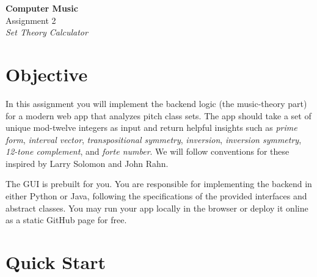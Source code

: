 \documentclass[11pt,letterpaper]{article}
\begin{document}
\begin{center}
{\Huge\sffamily\bfseries Computer Music}\\[0.5em]
{\LARGE\sffamily Assignment 2}\\[0.3em]
{\Large\sffamily\itshape Set Theory Calculator}
\end{center}

\vspace{1.5em}

\section{Objective}

In this assignment you will implement the backend logic (the music-theory part) for a modern web app that analyzes pitch class sets. The app should take a set of unique mod-twelve integers as input and return helpful insights such as \emph{prime form}, \emph{interval vector}, \emph{transpositional symmetry}, \emph{inversion}, \emph{inversion symmetry}, \emph{12-tone complement}, and \emph{forte number}. We will follow conventions for these inspired by Larry Solomon and John Rahn.

The GUI is prebuilt for you. You are responsible for implementing the backend in either Python or Java, following the specifications of the provided interfaces and abstract classes. You may run your app locally in the browser or deploy it online as a static GitHub page for free.

\section{Quick Start}
\end{document}
